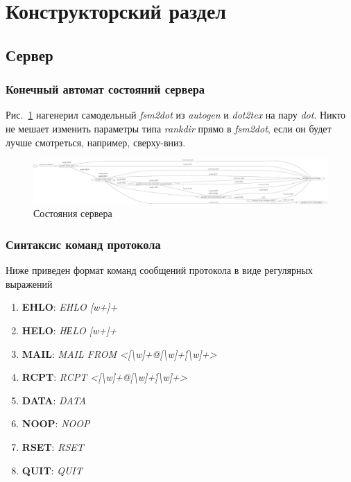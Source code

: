 \documentclass[a4paper,12pt]{report}
\begin{document}


\chapter*{Конструкторский раздел}

\section*{Сервер}

\subsection*{Конечный автомат состояний сервера}

Рис.~\ref{fig:server_fsm} нагенерил самодельный \textit{fsm2dot} из \textit{autogen} и \textit{dot2tex} на пару \textit{dot}. Никто не мешает изменить параметры типа \textit{rankdir} прямо в \textit{fsm2dot}, если он будет лучше смотреться, например, сверху-вниз.

\begin{figure}
\centering
\includegraphics[width=\textwidth]{static/server_dot.pdf}
\caption{Состояния сервера}
\label{fig:server_fsm}
\end{figure}

\subsection{Синтаксис команд протокола}
Ниже приведен формат команд сообщений протокола в виде регулярных выражений
\begin{enumerate}
\item \textbf{EHLO}: {\it EHLO [w+]+\/}
\item \textbf{HELO}: {\it HЕLO [w+]+\/}
\item \textbf{MAIL}: {\it MAIL FROM <[\textbackslash w]+@[\textbackslash w]+\.[\textbackslash w]+>\/}
\item \textbf{RCPT}: {\it RCPT <[\textbackslash w]+@[\textbackslash w]+\.[\textbackslash w]+>\/}
\item \textbf{DATA}: {\it DATA\/}
\item \textbf{NOOP}: {\it NOOP\/}
\item \textbf{RSET}: {\it RSET\/}
\item \textbf{QUIT}: {\it QUIT\/}
\end{enumerate}
\end{document}
